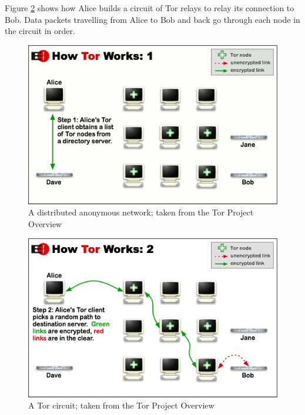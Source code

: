 \documentclass[11pt]{article} %
\begin{document}
Figure \ref{fig:torCircuit} shows how Alice builds a circuit of Tor relays to relay its connection to Bob. Data packets travelling from Alice to Bob and back go through each node in the circuit in order. 

\begin{figure}[h!]
\begin{center}
\includegraphics[scale=0.7]{htw1}
\end{center}
 \caption{A distributed anonymous network; taken from the Tor Project Overview \citep*{web:torOverview}}
 \label{fig:torNetwork}
 \end{figure}

\begin{figure}[h!]
\begin{center}
\includegraphics[scale=0.7]{htw2}
\end{center}
 \caption{A Tor circuit; taken from the Tor Project Overview \citep*{web:torOverview}}
 \label{fig:torCircuit}
 \end{figure}
\end{document}
